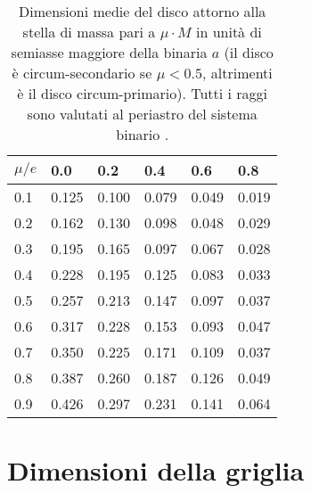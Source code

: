 \begin{table}[H]
\begin{center}
\begin{tabular}{|C{2cm}|C{2cm}|C{2cm}|C{2cm}|C{2cm}|C{2cm}|}
\hline
{}
$\mu/e$ & 0.0 & 0.2 & 0.4 & 0.6 & 0.8 \\
\hline
{} 0.1 & 0.125 & 0.100 & 0.079 & 0.049 & 0.019 \\
\hline
{} 0.2 & 0.162 & 0.130 & 0.098 & 0.048 & 0.029 \\
\hline
{} 0.3 & 0.195 & 0.165 & 0.097 & 0.067 & 0.028 \\
\hline
{} 0.4 & 0.228 & 0.195 & 0.125 & 0.083 & 0.033 \\
\hline
{} 0.5 & 0.257 & 0.213 & 0.147 & 0.097 & 0.037 \\
\hline
{} 0.6 & 0.317 & 0.228 & 0.153 & 0.093 & 0.047 \\
\hline
{} 0.7 & 0.350 & 0.225 & 0.171 & 0.109 & 0.037 \\
\hline
{} 0.8 & 0.387 & 0.260 & 0.187 & 0.126 & 0.049 \\
\hline
{} 0.9 & 0.426 & 0.297 & 0.231 & 0.141 & 0.064 \\
\hline
\end{tabular}
\caption{Dimensioni medie del disco attorno alla stella di massa pari a $\mu \cdot M$ in unità di semiasse maggiore della binaria $a$ (il disco è circum-secondario se $\mu < 0.5$, altrimenti è il disco circum-primario). Tutti i raggi sono valutati al periastro del sistema binario \parencite{Pichardo2005}.}
\label{tab:dim_pich}
\end{center}
\end{table}



\titleformat{\chapter}[display]
  {\normalfont\huge\bfseries}{\chaptertitlename\ \thechapter}{10pt}{\large}
\titlespacing{\chapter}{0pt}{-15pt}{10pt}
\chapter{Dimensioni della griglia} \label{appendiceC}

